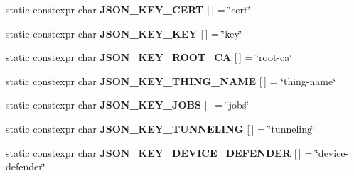 \begin{DoxyCompactItemize}
static constexpr char {\bfseries J\+S\+O\+N\+\_\+\+K\+E\+Y\+\_\+\+C\+E\+RT} \mbox{[}$\,$\mbox{]} = \char`\"{}cert\char`\"{}
\item 
\mbox{\label{struct_aws_1_1_iot_1_1_device_client_1_1_plain_config_a819fc8b7c4bfb3f508d6bf5d75e9a6c1}} 
static constexpr char {\bfseries J\+S\+O\+N\+\_\+\+K\+E\+Y\+\_\+\+K\+EY} \mbox{[}$\,$\mbox{]} = \char`\"{}key\char`\"{}
\item 
\mbox{\label{struct_aws_1_1_iot_1_1_device_client_1_1_plain_config_a3295893aa8b4352533218adcc8cf3551}} 
static constexpr char {\bfseries J\+S\+O\+N\+\_\+\+K\+E\+Y\+\_\+\+R\+O\+O\+T\+\_\+\+CA} \mbox{[}$\,$\mbox{]} = \char`\"{}root-\/ca\char`\"{}
\item 
\mbox{\label{struct_aws_1_1_iot_1_1_device_client_1_1_plain_config_a4e4874fe442e81ad007f0279b300ca6b}} 
static constexpr char {\bfseries J\+S\+O\+N\+\_\+\+K\+E\+Y\+\_\+\+T\+H\+I\+N\+G\+\_\+\+N\+A\+ME} \mbox{[}$\,$\mbox{]} = \char`\"{}thing-\/name\char`\"{}
\item 
\mbox{\label{struct_aws_1_1_iot_1_1_device_client_1_1_plain_config_aaf9e46cfbf5aaf6e454ebc327f0dd8cc}} 
static constexpr char {\bfseries J\+S\+O\+N\+\_\+\+K\+E\+Y\+\_\+\+J\+O\+BS} \mbox{[}$\,$\mbox{]} = \char`\"{}jobs\char`\"{}
\item 
\mbox{\label{struct_aws_1_1_iot_1_1_device_client_1_1_plain_config_a21479da245b17910d6694edede156bdf}} 
static constexpr char {\bfseries J\+S\+O\+N\+\_\+\+K\+E\+Y\+\_\+\+T\+U\+N\+N\+E\+L\+I\+NG} \mbox{[}$\,$\mbox{]} = \char`\"{}tunneling\char`\"{}
\item 
\mbox{\label{struct_aws_1_1_iot_1_1_device_client_1_1_plain_config_a788eadb68d1d226d01e38406f747dcd8}} 
static constexpr char {\bfseries J\+S\+O\+N\+\_\+\+K\+E\+Y\+\_\+\+D\+E\+V\+I\+C\+E\+\_\+\+D\+E\+F\+E\+N\+D\+ER} \mbox{[}$\,$\mbox{]} = \char`\"{}device-\/defender\char`\"{}
\item 
\mbox{\label{struct_aws_1_1_iot_1_1_device_client_1_1_plain_config_a23f968f89365ab975f6c846450d52f2d}} 

\end{DoxyCompactItemize}
